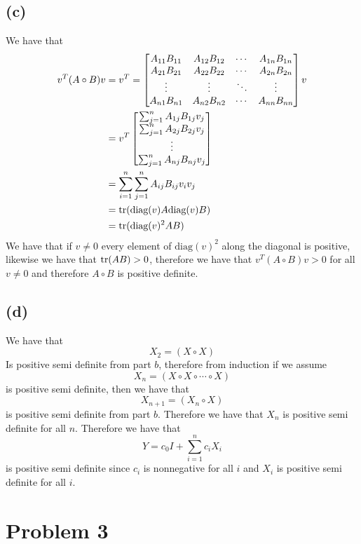 \documentclass[11pt]{article}
\begin{document}
\subsection*{(c)}
We have that 
\begin{align*}
    v^T (A\circ B)v &= v^T =\begin{bmatrix}
        A_{11} B_{11} & A_{12} B_{12} & \cdots & A_{1n} B_{1n}\\
        A_{21} B_{21} & A_{22} B_{22} & \cdots & A_{2n} B_{2n}\\
        \vdots & \vdots & \ddots & \vdots\\
        A_{n1} B_{n1} & A_{n2} B_{n2} & \cdots & A_{nn} B_{nn}\\
    \end{bmatrix} v \\
    &= v^T\begin{bmatrix}
        \sum_{j=1}^{n} A_{1j} B_{1j} v_j\\
        \sum_{j=1}^{n} A_{2j} B_{2j} v_j\\
        \vdots\\
        \sum_{j=1}^{n} A_{nj} B_{nj} v_j\\
    \end{bmatrix}\\
    &= \sum_{i=1}^{n} \sum_{j=1}^{n} A_{ij} B_{ij} v_i v_j\\
    &= \trace(\text{diag}(v) A \text{diag}(v) B)\\
    &= \trace(\text{diag}(v)^2 AB)
\end{align*}
We have that if $v\neq0$ every element of $\text{diag}(v)^2$
along the diagonal is positive, likewise we have that  $\trace(AB)> 0$, 
therefore we have that $v^T (A\circ B)v >0$ for all $v\neq0$ and therefore $A\circ B$ is positive definite.
\subsection*{(d)}
We have that
$$X_{2} = (X\circ X)$$
Is positive semi definite from part $b$, therefore from induction if we assume 
$$X_{n} = (X\circ X \circ \cdots \circ X)$$
is positive semi definite, then we have that
$$X_{n+1} = (X_{n}\circ X)$$
is positive semi definite from part $b$. Therefore we have that $X_{n}$ is positive semi definite for all $n$. Therefore 
we have that 
$$Y = c_0 I+ \sum_{i=1}^{n} c_i X_{i}$$
is positive semi definite since $c_i$ is nonnegative 
for all $i$ and $X_{i}$ is positive semi definite for all $i$.
\section*{Problem 3}
\end{document}

